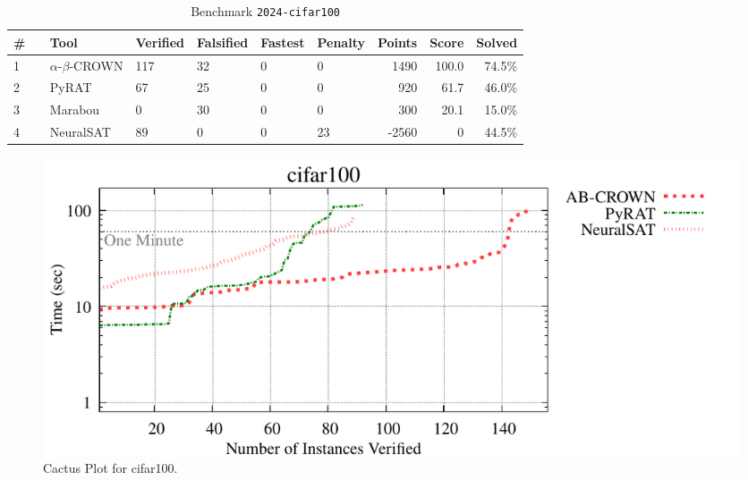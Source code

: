 \begin{table}[h]
\begin{center}
\caption{Benchmark \texttt{2024-cifar100}} \label{tab:cat_{cat}}
{\setlength{\tabcolsep}{2pt}
\begin{tabular}[h]{@{}llllllrrr@{}}
\toprule
\textbf{\# ~} & \textbf{Tool} & \textbf{Verified} & \textbf{Falsified} & \textbf{Fastest} & \textbf{Penalty} & \textbf{Points} & \textbf{Score} & \textbf{Solved}\\
\midrule
1 & $\alpha$-$\beta$-CROWN & 117 & 32 & 0 & 0 & 1490 & 100.0 & 74.5\% \\
2 & PyRAT & 67 & 25 & 0 & 0 & 920 & 61.7 & 46.0\% \\
3 & Marabou & 0 & 30 & 0 & 0 & 300 & 20.1 & 15.0\% \\
4 & NeuralSAT & 89 & 0 & 0 & 23 & -2560 & 0 & 44.5\% \\
\bottomrule
\end{tabular}
}
\end{center}
\end{table}



\begin{figure}[h]
\centerline{\includegraphics[width=\textwidth]{cactus/2024_cifar100.pdf}}
\caption{Cactus Plot for cifar100.}
\label{fig:quantPic}
\end{figure}


\clearpage


